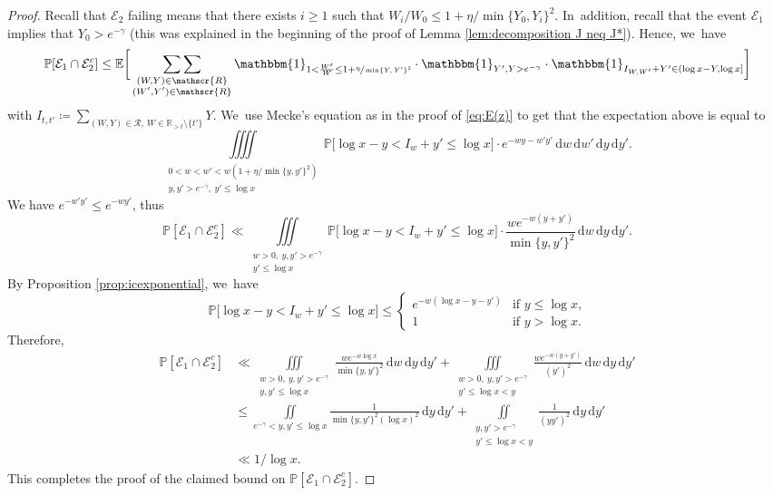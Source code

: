 \documentclass[10pt,a4paper]{article}
\newcommand{\RR}{\mathbb{R}}
\newcommand{\PP}{\mathbb{P}}
\newcommand{\EE}{\mathbb{E}}
\newcommand{\dee}{\,\mathrm{d}}
\newcommand{\one}{\mathbbm{1}}
\newcommand{\EC}{\mathcal{E}}
\newcommand{\RS}{\mathscr{R}}
\newcommand{\bg}{\big}
\newcommand{\bggg}{\bigg}
\theoremstyle{plain}
\theoremstyle{definition}
\begin{document}
\begin{proof} Recall that $\EC_2$ failing means that there exists $i\ge1$ such that $W_i/W_0\le 1+\eta/\min\{Y_0, Y_i\}^2$. In~addition, recall that the event $\EC_1$ implies that $Y_0 > e^{-\gamma}$ (this was explained in the beginning of the proof of Lemma \ref{lem:decomposition J neq J*}). Hence, we~have
\[
\PP[\EC_1 \cap \EC_2^c] \le
\EE\bggg[ \mathop{\sum\sum}_{\substack{(W,Y) \in \RS \\ (W',Y')\in\RS}} \one_{1< \frac{W'}{W} \le 1+\sfrac{\eta}{\min\{Y,Y'\}^2}}\cdot\one_{Y',Y>e^{-\gamma}} \cdot \one_{I_{W, W'} + Y'\in(\log x-Y,\log x]} \bggg]
\]
with $I_{t, t'} \coloneqq \sum_{(W, Y) \in \RS,\ W \in \RR_{>t}\setminus\{t'\}} Y$. We~use Mecke's equation as in the proof of \eqref{eq:E(z)} to get that the expectation above is equal to
\[
\iiiint\limits_{\substack{0 < w < w' < w(1+\eta/\min\{y,y'\}^2)\\ y, y' > e^{-\gamma},\ y'\le \log x}} \PP\bg[\log x - y<I_w + y' \le \log x\bg]\cdot e^{-wy-w'y'}
\dee w\dee w'\dee y\dee y'.
\]
We have $e^{-w'y'}\le e^{-wy'}$, thus
\[
\PP[\EC_1 \cap \EC_2^c] \ll
\iiint\limits_{\substack{w>0,\ y, y' > e^{-\gamma} \\ y'\le \log x}}
\PP\bg[\log x - y<I_w + y' \le \log x\bg]\cdot \frac{we^{-w(y+y')}}{\min\{y,y'\}^2} \dee w\dee y\dee y'.
\]
By Proposition \ref{prop:icexponential}, we~have
\[
\PP\bg[\log x - y<I_w + y' \le \log x\bg] \le \begin{cases}
e^{-w(\log x - y-y')}&\text{if $y \le \log x$,} \\
1 & \text{if $y > \log x$.}
\end{cases}
\]
Therefore,
\begin{align*}
\PP[\EC_1 \cap \EC_2^c]
&\ll \iiint\limits_{\substack{w>0,\ y, y' > e^{-\gamma} \\ y,y'\le \log x}}
\frac{we^{-w\log x}}{\min\{y,y'\}^2}\dee w\dee y\dee y'
+\iiint\limits_{\substack{w>0,\ y, y' > e^{-\gamma} \\ y'\le \log x<y}}
\frac{we^{-w(y+y')}}{(y')^2}\dee w\dee y\dee y' \\
&\le \iint\limits_{e^{-\gamma}<y, y'\le \log x}
\frac{1}{\min\{y,y'\}^2(\log x)^2}\dee y\dee y'
+\iint\limits_{\substack{y, y' > e^{-\gamma} \\ y'\le \log x<y}}
\frac{1}{(yy')^2} \dee y\dee y' \\
&\ll 1/\log x.
\end{align*}
This completes the proof of the claimed bound on $\PP[\EC_1\cap \EC_2^c]$.


\end{proof}
\end{document}
